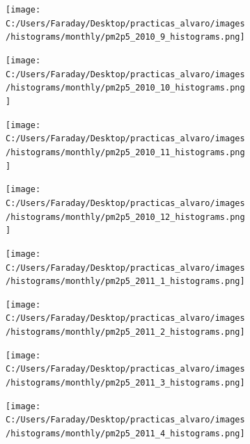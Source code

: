 \documentclass[12pt]{article}
\begin{document}
\begin{figure}[H]
\centering
\begin{subfigure}[h]{0.45\textwidth}
\texttt{[image: C:/Users/Faraday/Desktop/practicas\_alvaro/images/histograms/monthly/pm2p5\_2010\_9\_histograms.png]}
\caption{}
\label{fig:hist-mon-4-9-2010}
\end{subfigure}
%
\begin{subfigure}[H]{0.45\textwidth}
\texttt{[image: C:/Users/Faraday/Desktop/practicas\_alvaro/images/histograms/monthly/pm2p5\_2010\_10\_histograms.png]}
\caption{}
\label{fig:hist-mon-4-10-2010}
\end{subfigure}
\caption{}
\end{figure}

\begin{figure}[H]
\centering
\begin{subfigure}[h]{0.45\textwidth}
\texttt{[image: C:/Users/Faraday/Desktop/practicas\_alvaro/images/histograms/monthly/pm2p5\_2010\_11\_histograms.png]}
\caption{}
\label{fig:hist-mon-4-11-2010}
\end{subfigure}
%
\begin{subfigure}[H]{0.45\textwidth}
\texttt{[image: C:/Users/Faraday/Desktop/practicas\_alvaro/images/histograms/monthly/pm2p5\_2010\_12\_histograms.png]}
\caption{}
\label{fig:hist-mon-4-12-2010}
\end{subfigure}
\caption{}
\end{figure}

\newpage

\begin{figure}[H]
\centering
\begin{subfigure}[h]{0.45\textwidth}
\texttt{[image: C:/Users/Faraday/Desktop/practicas\_alvaro/images/histograms/monthly/pm2p5\_2011\_1\_histograms.png]}
\caption{}
\label{fig:hist-mon-4-1-2011}
\end{subfigure}
%
\begin{subfigure}[H]{0.45\textwidth}
\texttt{[image: C:/Users/Faraday/Desktop/practicas\_alvaro/images/histograms/monthly/pm2p5\_2011\_2\_histograms.png]}
\caption{}
\label{fig:hist-mon-4-2-2011}
\end{subfigure}
\caption{}
\end{figure}

\begin{figure}[H]
\centering
\begin{subfigure}[h]{0.45\textwidth}
\texttt{[image: C:/Users/Faraday/Desktop/practicas\_alvaro/images/histograms/monthly/pm2p5\_2011\_3\_histograms.png]}
\caption{}
\label{fig:hist-mon-4-3-2011}
\end{subfigure}
%
\begin{subfigure}[H]{0.45\textwidth}
\texttt{[image: C:/Users/Faraday/Desktop/practicas\_alvaro/images/histograms/monthly/pm2p5\_2011\_4\_histograms.png]}
\caption{}
\label{fig:hist-mon-4-4-2011}
\end{subfigure}
\caption{}
\end{figure}
\end{document}

